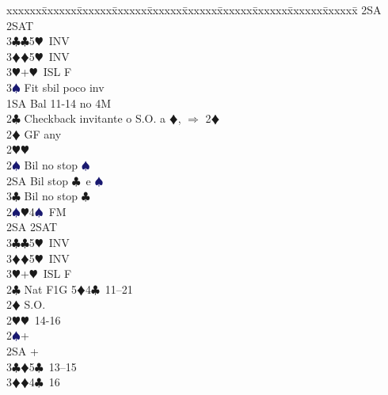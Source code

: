 \documentclass[a4paper,italian]{article}
\newcommand{\BC}{\textcolor{OliveGreen}{$\clubsuit$}}
\newcommand{\BD}{\textcolor{RedOrange}{$\vardiamondsuit$}}
\newcommand{\BH}{\textcolor{Red2}{$\varheartsuit${}}}
\newcommand{\BS}{\textcolor{MidnightBlue}{$\spadesuit${}}}
\newenvironment{bidtable}
{\begin{tabbing}

    xxxxxx\=xxxxxx\=xxxxxx\=xxxxxx\=xxxxxx\=xxxxxx\=xxxxxx\=xxxxxx\=xxxxxx\=xxxxxx\=\kill}
{\end{tabbing} }%
\begin{document}
\begin{multicols}{2}
\begin{bidtable}
                                            2SA \> 2SAT\\
                                            3\BC {}\BC 5\BH\ INV\\
                                            3\BD {}\BD 5\BH\ INV\\
                                            3\BH {}+\BH\ ISL F\\
                                            3\BS \> Fit sbil poco inv\-\\
                                            1SA \> Bal 11-14 no 4M\+\\
                                            2\BC \> Checkback invitante o S.O. a \BD , $\Rightarrow$ 2\BD \\
                                            2\BD \> GF any\+\\
                                            2\BH {}\BH \\
                                            2\BS \> Bil no stop \BS \\
                                            2SA \> Bil stop \BC\ e \BS \\
                                            3\BC \> Bil no stop \BC \-\\
                                            2\BS {}\BH 4\BS\ FM\\
                                            2SA \> 2SAT\\
                                            3\BC {}\BC 5\BH\ INV\\
                                            3\BD {}\BD 5\BH\ INV\\
                                            3\BH {}+\BH\ ISL F\-\\
                                            2\BC \> Nat F1G 5\BD 4\BC\ 11--21\+\\
                                            2\BD \> S.O.\+\\
                                            2\BH {}\BH\ 14-16\\
                                            2\BS {}+\\
                                            2SA +\\
                                            3\BC {}\BD 5\BC\ 13--15\\
                                            3\BD {}\BD 4\BC\ 16\\

\end{bidtable}
\end{multicols}
\end{document}
